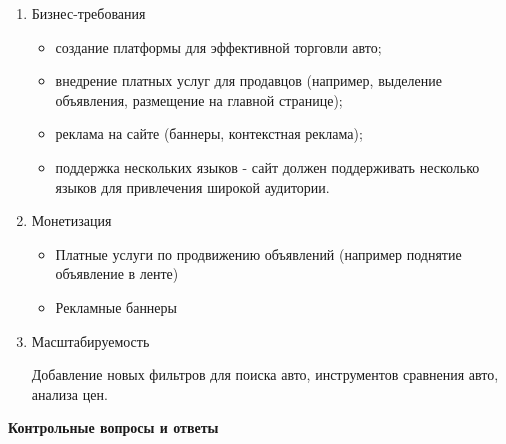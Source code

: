 \begin{enumerate}
\begin{itemize}
        \end{itemize}
    \item Бизнес-требования
        \begin{itemize}
            \item создание платформы для эффективной торговли авто;
            \item внедрение платных услуг для продавцов (например, выделение объявления, размещение на главной странице);
            \item реклама на сайте (баннеры, контекстная реклама);
            \item поддержка нескольких языков - сайт должен поддерживать несколько языков для привлечения широкой аудитории.
        \end{itemize}
    \item Монетизация
        \begin{itemize}
            \item Платные услуги по продвижению объявлений (например поднятие объявление в ленте)
            \item Рекламные баннеры
        \end{itemize}
    \item Масштабируемость
        
        Добавление новых фильтров для поиска авто, инструментов сравнения авто, анализа цен.
\end{enumerate}

\textbf{Контрольные вопросы и ответы}

